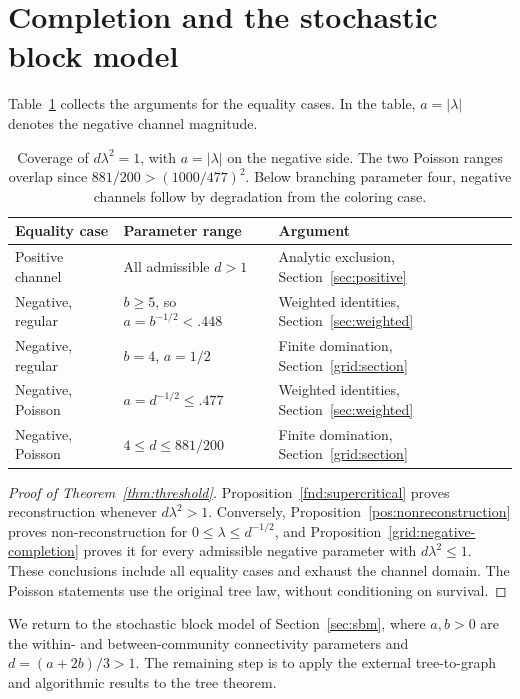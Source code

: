 \section{Completion and the stochastic block model}\label{sec:completion}
Table~\ref{tab:coverage} collects the arguments for the equality cases.
In the table, $a=|\lambda|$ denotes the negative channel magnitude.

\begin{table}[ht]
\centering\small
\begin{tabular}{@{}p{}p{}p{}@{}}
\toprule
Equality case & Parameter range & Argument\\
\midrule
Positive channel & All admissible $d>1$ & Analytic exclusion, Section~\ref{sec:positive}\\
Negative, regular & $b\ge5$, so $a=b^{-1/2}<.448$ & Weighted identities, Section~\ref{sec:weighted}\\
Negative, regular & $b=4$, $a=1/2$ & Finite domination, Section~\ref{grid:section}\\
Negative, Poisson & $a=d^{-1/2}\le.477$ & Weighted identities, Section~\ref{sec:weighted}\\
Negative, Poisson & $4\le d\le881/200$ & Finite domination, Section~\ref{grid:section}\\
\bottomrule
\end{tabular}
\caption{Coverage of $d\lambda^2=1$, with $a=|\lambda|$ on the
negative side. The two Poisson ranges overlap since
$881/200>(1000/477)^2$. Below branching parameter four, negative channels
follow by degradation from the coloring case.}\label{tab:coverage}
\end{table}

\begin{proof}[Proof of Theorem~\ref{thm:threshold}]
Proposition~\ref{fnd:supercritical} proves reconstruction whenever
$d\lambda^2>1$.  Conversely, Proposition~\ref{pos:nonreconstruction}
proves non-reconstruction for $0\le\lambda\le d^{-1/2}$, and
Proposition~\ref{grid:negative-completion} proves it for every admissible
negative parameter with $d\lambda^2\le1$.  These conclusions include
all equality cases and exhaust the channel domain.  The Poisson
statements use the original tree law, without conditioning on survival.
\end{proof}

We return to the stochastic block model of Section~\ref{sec:sbm},
where $a,b>0$ are the within- and between-community connectivity
parameters and $d=(a+2b)/3>1$.  The remaining step is to apply the
external tree-to-graph and algorithmic results to the tree theorem.


